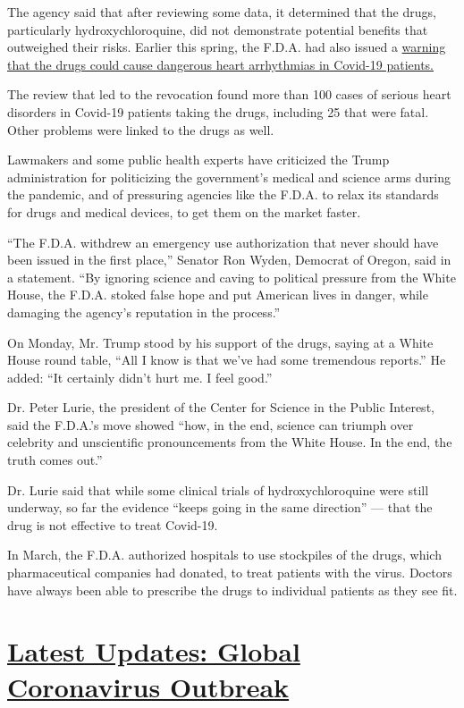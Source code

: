 The agency said that after reviewing some data, it determined that the
drugs, particularly hydroxychloroquine, did not demonstrate potential
benefits that outweighed their risks. Earlier this spring, the F.D.A.
had also issued a
\href{https://www.nytimes.com/2020/04/24/health/fda-hydroxychloroquine-coronavirus.html}{warning
that the drugs could cause dangerous heart arrhythmias in Covid-19
patients.}

The review that led to the revocation found more than 100 cases of
serious heart disorders in Covid-19 patients taking the drugs, including
25 that were fatal. Other problems were linked to the drugs as well.

Lawmakers and some public health experts have criticized the Trump
administration for politicizing the government's medical and science
arms during the pandemic, and of pressuring agencies like the F.D.A. to
relax its standards for drugs and medical devices, to get them on the
market faster.

``The F.D.A. withdrew an emergency use authorization that never should
have been issued in the first place,'' Senator Ron Wyden, Democrat of
Oregon, said in a statement. ``By ignoring science and caving to
political pressure from the White House, the F.D.A. stoked false hope
and put American lives in danger, while damaging the agency's reputation
in the process.''

On Monday, Mr. Trump stood by his support of the drugs, saying at a
White House round table, ``All I know is that we've had some tremendous
reports.'' He added: ``It certainly didn't hurt me. I feel good.''

Dr. Peter Lurie, the president of the Center for Science in the Public
Interest, said the F.D.A.'s move showed ``how, in the end, science can
triumph over celebrity and unscientific pronouncements from the White
House. In the end, the truth comes out.''

Dr. Lurie said that while some clinical trials of hydroxychloroquine
were still underway, so far the evidence ``keeps going in the same
direction'' --- that the drug is not effective to treat Covid-19.

In March, the F.D.A. authorized hospitals to use stockpiles of the
drugs, which pharmaceutical companies had donated, to treat patients
with the virus. Doctors have always been able to prescribe the drugs to
individual patients as they see fit.

\hypertarget{latest-updates-global-coronavirus-outbreak}{%
\section{\texorpdfstring{\href{https://www.nytimes.com/2020/08/01/world/coronavirus-covid-19.html?action=click\&pgtype=Article\&state=default\&region=MAIN_CONTENT_1\&context=storylines_live_updates}{Latest
Updates: Global Coronavirus
Outbreak}}{Latest Updates: Global Coronavirus Outbreak}}\label{latest-updates-global-coronavirus-outbreak}}

